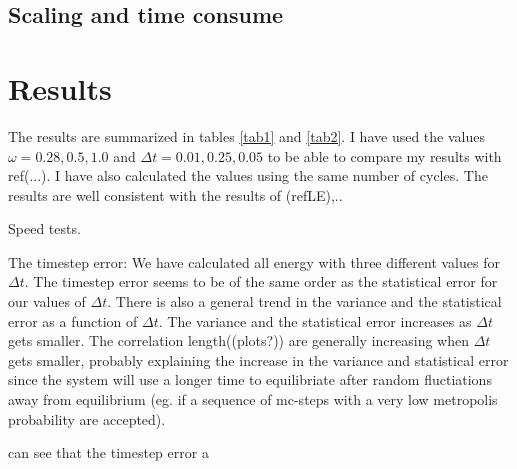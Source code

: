\documentclass[a4paper,10pt,twocolumn]{article} %
\newcommand{\expec}[1]{\langle{}{#1}\rangle{}}
\begin{document}
\subsection{Scaling and time consume}%


\section{Results} %

The results are summarized in tables \ref{tab1} and \ref{tab2}. I have used the values $\omega=0.28,0.5,1.0$ and $\Delta t = 0.01,0.25,0.05$ to be able to compare my 
results with ref(...). I have also calculated the values using the same number of cycles. The results are well consistent with the results of (refLE),..

Speed tests.


The timestep error: We have calculated all energy with three different values for $\Delta t$. 
The timestep error seems to be of the same order as the statistical error for our values of $\Delta t$. 
There is also a general trend in the variance and the statistical error as a function of $\Delta t$. The variance and the statistical error increases as $\Delta t$ gets smaller.
The correlation length((plots?)) are generally increasing when $\Delta t$ gets smaller, probably explaining the increase in the variance and statistical error since the system will use a longer
time to equilibriate after random fluctiations away from equilibrium (eg. if a sequence of mc-steps with a very low metropolis probability are accepted).
%





 can see that the timestep error   a 
\end{document}
